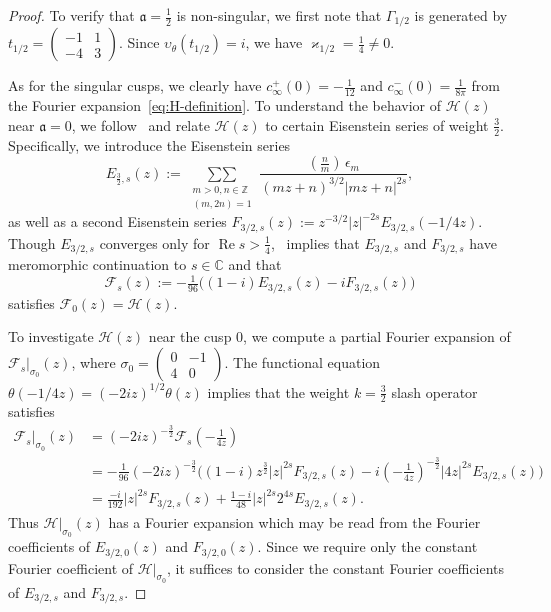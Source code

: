 \documentclass[11pt,reqno]{amsart}
\theoremstyle{plain}
\theoremstyle{definition}
\numberwithin{equation}{section}
\renewcommand{\Re}{\operatorname{Re}}
\begin{document}
\begin{proof}
To verify that $\mathfrak{a} = \frac{1}{2}$ is non-singular, we first note that $\Gamma_{1/2}$ is generated by $t_{1/2} = (\begin{smallmatrix} -1 & 1 \\ -4 & 3 \end{smallmatrix})$. Since $\upsilon_\theta(t_{1/2}) = i$, we have $\varkappa_{1/2} = \frac{1}{4} \neq 0$.

As for the singular cusps, we clearly have $c_\infty^+(0) = -\frac{1}{12}$ and $c_\infty^-(0) = \frac{1}{8\pi}$ from the Fourier expansion~\eqref{eq:H-definition}. 
To understand the behavior of $\mathcal{H}(z)$ near $\mathfrak{a} = 0$, we follow~\cite{HirzebruchZagier76} and relate $\mathcal{H}(z)$ to certain Eisenstein series of weight $\frac{3}{2}$. Specifically, we introduce the Eisenstein series
\[
	E_{\frac{3}{2},s}(z) 
		:= \mathop{\sum\sum}\limits_{\substack{m>0, n \in \mathbb{Z} \\ (m,2n)=1}}
				\frac{(\frac{n}{m}) \, \epsilon_m}{(mz+n)^{3/2} \vert m z + n \vert^{2s}},
\]
as well as a second Eisenstein series $F_{3/2,s}(z) := z^{-3/2} \vert z \vert^{-2s} E_{3/2,s}(-1/4z)$. Though $E_{3/2,s}$ converges only for $\Re s > \frac{1}{4}$,~\cite[Theorem 2]{HirzebruchZagier76} implies that $E_{3/2,s}$ and $F_{3/2,s}$ have meromorphic continuation to $s \in \mathbb{C}$ and that
\[
\mathcal{F}_s(z) := - \tfrac{1}{96}\big((1-i) E_{3/2,s}(z) - i F_{3/2,s}(z) \big)
\]
satisfies $\mathcal{F}_0(z) = \mathcal{H}(z)$.

To investigate $\mathcal{H}(z)$ near the cusp $0$, we compute a partial Fourier expansion of $\mathcal{F}_s \vert_{\sigma_0}(z)$, where $\sigma_0 = (\begin{smallmatrix} 0 & -1 \\ 4 & 0 \end{smallmatrix})$. The functional equation $\theta(-1/4z) = (-2iz)^{1/2} \theta(z)$ implies that the weight $k=\frac{3}{2}$ slash operator satisfies
\begin{align*}
	\mathcal{F}_s \vert_{\sigma_0}(z) 
		&= (-2iz)^{-\frac{3}{2}} \mathcal{F}_s(-\tfrac{1}{4z}) \\
		&=  - \tfrac{1}{96} (-2iz)^{-\frac{3}{2}} 
					\big((1-i) z^{\frac{3}{2}} \vert z \vert^{2s} F_{3/2,s}(z) 
						- i (-\tfrac{1}{4z})^{-\frac{3}{2}} \vert 4z \vert^{2s} E_{3/2,s}(z) \big) \\
		&= \frac{-i}{192} \vert z \vert^{2s} F_{3/2,s}(z) 
					+ \frac{1-i}{48} \vert z \vert^{2s} 2^{4s} E_{3/2,s}(z).
\end{align*}
Thus $\mathcal{H}\vert_{\sigma_0}(z)$ has a Fourier expansion which may be read from the Fourier coefficients of $E_{3/2,0}(z)$ and $F_{3/2,0}(z)$. Since we require only the constant Fourier coefficient of $\mathcal{H}\vert_{\sigma_0}$, it suffices to consider the constant Fourier coefficients of $E_{3/2,s}$ and $F_{3/2,s}$.


\end{proof}
\end{document}

